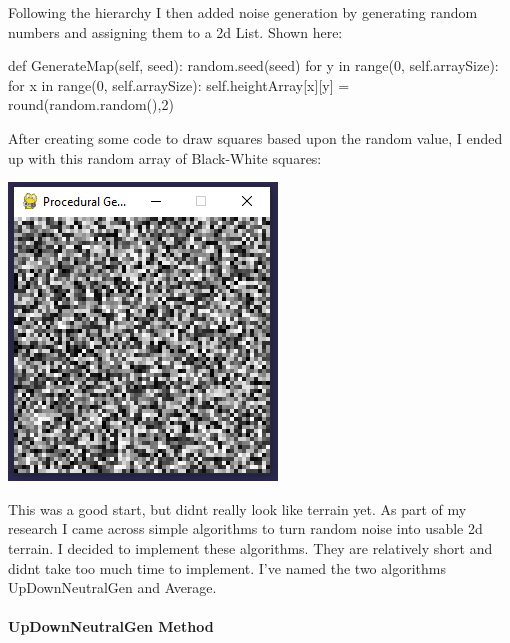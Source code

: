 \begin{flushleft}
            \vspace{0.5cm}

            Following the hierarchy I then added noise generation by generating random numbers and 
            assigning them to a 2d List. Shown here: 
            
            \begin{pythoncode}
def GenerateMap(self, seed):
    random.seed(seed)
    for y in range(0, self.arraySize):
        for x in range(0, self.arraySize):
            self.heightArray[x][y] = round(random.random(),2)
        \end{pythoncode}

            \vspace{0.5cm}

            \large
            After creating some code to draw squares based upon the random value, I ended up with this 
            random array of Black-White squares:\\
            \vspace{0.5cm}
            \centerline{\includegraphics{Images/Prototype/RandomNoiseExample.PNG}}

            \vspace{0.5cm}

            This was a good start, but didnt really look like terrain yet. As part of my research I came 
            across simple algorithms to turn random noise into usable 2d terrain. I decided to implement
            these algorithms. They are relatively short and didnt take too much time to implement. I've
            named the two algorithms UpDownNeutralGen and Average.

            \vspace{1cm}

            \paragraph{UpDownNeutralGen Method} \mbox{} \\
            \vspace{0.25cm}


\end{flushleft}
